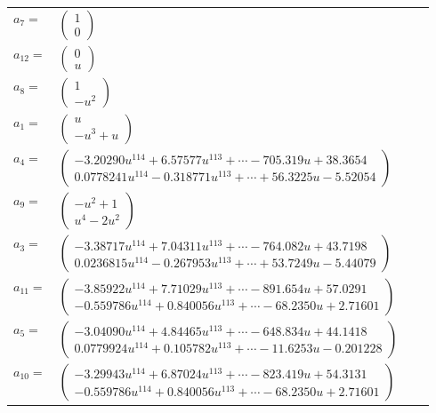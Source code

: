\documentclass[1p]{elsarticle_modified}
\theoremstyle{definition}
\begin{document}
\begin{tabular}{m{7pt} m{180pt} m{7pt} m{180pt} }
\flushright $a_{7}=$&$\begin{pmatrix}1\\0\end{pmatrix}$ \\
\flushright $a_{12}=$&$\begin{pmatrix}0\\u\end{pmatrix}$ \\
\flushright $a_{8}=$&$\begin{pmatrix}1\\- u^2\end{pmatrix}$ \\
\flushright $a_{1}=$&$\begin{pmatrix}u\\- u^3+u\end{pmatrix}$ \\
\flushright $a_{4}=$&$\begin{pmatrix}-3.20290 u^{114}+6.57577 u^{113}+\cdots-705.319 u+38.3654\\0.0778241 u^{114}-0.318771 u^{113}+\cdots+56.3225 u-5.52054\end{pmatrix}$ \\
\flushright $a_{9}=$&$\begin{pmatrix}- u^2+1\\u^4-2 u^2\end{pmatrix}$ \\
\flushright $a_{3}=$&$\begin{pmatrix}-3.38717 u^{114}+7.04311 u^{113}+\cdots-764.082 u+43.7198\\0.0236815 u^{114}-0.267953 u^{113}+\cdots+53.7249 u-5.44079\end{pmatrix}$ \\
\flushright $a_{11}=$&$\begin{pmatrix}-3.85922 u^{114}+7.71029 u^{113}+\cdots-891.654 u+57.0291\\-0.559786 u^{114}+0.840056 u^{113}+\cdots-68.2350 u+2.71601\end{pmatrix}$ \\
\flushright $a_{5}=$&$\begin{pmatrix}-3.04090 u^{114}+4.84465 u^{113}+\cdots-648.834 u+44.1418\\0.0779924 u^{114}+0.105782 u^{113}+\cdots-11.6253 u-0.201228\end{pmatrix}$ \\
\flushright $a_{10}=$&$\begin{pmatrix}-3.29943 u^{114}+6.87024 u^{113}+\cdots-823.419 u+54.3131\\-0.559786 u^{114}+0.840056 u^{113}+\cdots-68.2350 u+2.71601\end{pmatrix}$ \\

\end{tabular}
\end{document}
